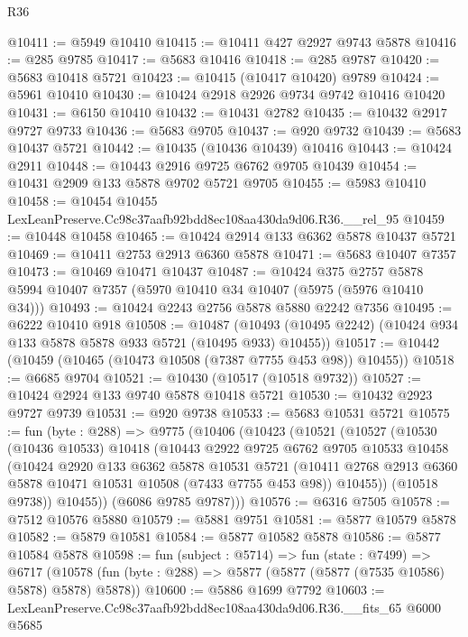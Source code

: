 \begin{lexlean}{R36}
\begin{coremodule}
@10411 := @5949 @10410
@10415 := @10411 @427 @2927 @9743 @5878
@10416 := @285 @9785
@10417 := @5683 @10416
@10418 := @285 @9787
@10420 := @5683 @10418 @5721
@10423 := @10415 (@10417 @10420) @9789
@10424 := @5961 @10410
@10430 := @10424 @2918 @2926 @9734 @9742 @10416 @10420
@10431 := @6150 @10410
@10432 := @10431 @2782
@10435 := @10432 @2917 @9727 @9733
@10436 := @5683 @9705
@10437 := @920 @9732
@10439 := @5683 @10437 @5721
@10442 := @10435 (@10436 @10439) @10416
@10443 := @10424 @2911
@10448 := @10443 @2916 @9725 @6762 @9705 @10439
@10454 := @10431 @2909 @133 @5878 @9702 @5721 @9705
@10455 := @5983 @10410
@10458 := @10454 @10455 LexLeanPreserve.Cc98c37aafb92bdd8ec108aa430da9d06.R36.__rel_95
@10459 := @10448 @10458
@10465 := @10424 @2914 @133 @6362 @5878 @10437 @5721
@10469 := @10411 @2753 @2913 @6360 @5878
@10471 := @5683 @10407 @7357
@10473 := @10469 @10471 @10437
@10487 := @10424
    @375
    @2757
    @5878
    @5994
    @10407
    @7357
    (@5970 @10410 @34 @10407 (@5975 (@5976 @10410 @34)))
@10493 := @10424 @2243 @2756 @5878 @5880 @2242 @7356
@10495 := @6222 @10410 @918
@10508 := @10487
    (@10493 (@10495 @2242) (@10424 @934 @133 @5878 @5878 @933 @5721 (@10495 @933) @10455))
@10517 := @10442 (@10459 (@10465 (@10473 @10508 (@7387 @7755 @453 @98)) @10455))
@10518 := @6685 @9704
@10521 := @10430 (@10517 (@10518 @9732))
@10527 := @10424 @2924 @133 @9740 @5878 @10418 @5721
@10530 := @10432 @2923 @9727 @9739
@10531 := @920 @9738
@10533 := @5683 @10531 @5721
@10575 := fun (byte : @288) =>
  @9775
    (@10406
      (@10423
        (@10521
          (@10527
            (@10530
              (@10436 @10533)
              @10418
              (@10443
                @2922
                @9725
                @6762
                @9705
                @10533
                @10458
                (@10424
                  @2920
                  @133
                  @6362
                  @5878
                  @10531
                  @5721
                  (@10411 @2768 @2913 @6360 @5878 @10471 @10531 @10508 (@7433 @7755 @453 @98))
                  @10455))
              (@10518 @9738))
            @10455))
        (@6086 @9785 @9787)))
@10576 := @6316 @7505
@10578 := @7512 @10576 @5880
@10579 := @5881 @9751
@10581 := @5877 @10579 @5878
@10582 := @5879 @10581
@10584 := @5877 @10582 @5878
@10586 := @5877 @10584 @5878
@10598 := fun (subject : @5714) =>
  fun (state : @7499) =>
  @6717 (@10578 (fun (byte : @288) => @5877 (@5877 (@5877 (@7535 @10586) @5878) @5878) @5878))
@10600 := @5886 @1699 @7792
@10603 := LexLeanPreserve.Cc98c37aafb92bdd8ec108aa430da9d06.R36.__fits_65 @6000 @5685

\end{coremodule}
\end{lexlean}
